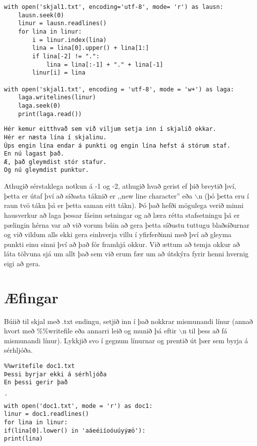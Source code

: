 \begin{lstlisting}[caption=Leysum punkta og hástafa vandann okkar, label=lst:skjalavinnsla-lausn]
with open('skjal1.txt', encoding='utf-8', mode= 'r') as lausn:
	lausn.seek(0)
	linur = lausn.readlines()
	for lina in linur:
		i = linur.index(lina)
		lina = lina[0].upper() + lina[1:]
		if lina[-2] != ".":
			lina = lina[:-1] + "." + lina[-1]
		linur[i] = lina

with open('skjal1.txt', encoding = 'utf-8', mode = 'w+') as laga:
	laga.writelines(linur)
	laga.seek(0)
	print(laga.read())
\end{lstlisting}
\lstset{style=uttak}
\begin{lstlisting}
Hér kemur eitthvað sem við viljum setja inn í skjalið okkar.
Hér er næsta lína í skjalinu.
Úps engin lína endar á punkti og engin lína hefst á stórum staf.
En nú lagast það.
Æ, það gleymdist stór stafur.
Og nú gleymdist punktur.
\end{lstlisting}
\lstset{style=venjulegt}

Athugið sérstaklega notkun á -1 og -2, athugið hvað gerist ef þið breytið því, þetta er útaf því að síðasta táknið er ,,new line character'' eða $\backslash$n (þó þetta eru í raun tvö tákn þá er þetta saman eitt tákn).
Þó það hefði mögulega verið minni hausverkur að laga þessar fáeinu setningar og að læra rétta stafsetningu þá er pælingin hérna var að við vorum búin að gera þetta síðustu tuttugu blaðsíðurnar og við vildum alls ekki gera einhverja villu í yfirferðinni með því að gleyma punkti einu sinni því að það fór framhjá okkur.
Við ættum að temja okkur að láta tölvuna sjá um allt það sem við erum fær um að útskýra fyrir henni hvernig eigi að gera.

\newpage
\section{Æfingar}

\begin{exercise}\label{doc1}
Búiið til skjal með .txt endingu, setjið inn í það nokkrar mismunandi línur (annað hvort með \%\%writefile eða annarri leið og munið þá eftir $\backslash$n til þess að fá mismunandi línur).
Lykkjið svo í gegnum línurnar og prentið út þær sem byrja á sérhljóða.
\end{exercise}
\begin{Answer}[ref={doc1}]

	\begin{lstlisting}
%%writefile doc1.txt
Þessi byrjar ekki á sérhljóða
En þessi gerir það
\end{lstlisting}
\begin{lstlisting}´
with open('doc1.txt', mode = 'r') as doc1:
linur = doc1.readlines()
for lina in linur:
if(lina[0].lower() in 'aáeéiíoóuúyýæö'):
print(lina)\end{lstlisting}
\end{Answer}


